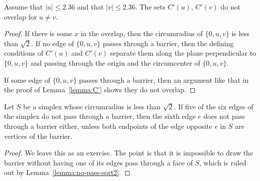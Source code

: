 \begin{lemma}
Assume that $|u|\le 2.36$ and that $|v|\le 2.36$.   The sets
$C'(u)$, $C'(v)$ do not overlap for $u\ne v$.
\end{lemma}

\begin{proof}  If there is some $x$ in the overlap,
then the circumradius of $\{0,u,v\}$ is less than $\sqrt2$. If no
edge of $\{0,u,v\}$ passes through a barrier, then the defining
conditions of $C'(u)$ and $C'(v)$ separate them along the plane
perpendicular to $\{0,u,v\}$ and passing through the origin and
the circumcenter of $\{0,u,v\}$.

If some edge of $\{0,u,v\}$ passes through a barrier, then an
argument like that in the proof of Lemma~\ref{lemma:C'} shows they
do not overlap. 
\end{proof}

\begin{lemma}\label{lemma:sixth}
Let $S$ be a simplex whose circumradius is less than $\sqrt2$.  If
five of the six edges of the simplex do not pass through a barrier,
then the sixth edge $e$ does not pass through a barrier either,
unless both endpoints of the edge opposite $e$ in $S$ are vertices
of the barrier.
\end{lemma}

\begin{proof} We leave this as an exercise.  The point is that it
is impossible to draw the barrier without having one of its edges
pass through a face of $S$, which is ruled out by
Lemma~\ref{lemma:no-pass-sqrt2}.
\end{proof}


